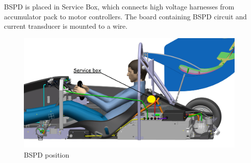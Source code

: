 BSPD is placed in Service Box, which connects high voltage harnesses from accumulator pack to motor controllers. The board containing BSPD circuit and current transducer is mounted to a wire.
\begin{figure}[H]
	\centering
	\includegraphics[width=\textwidth]{./img/ServiceBox-position.jpg}
	\caption{BSPD position}
	\label{fig:BSPD-position}
\end{figure}

